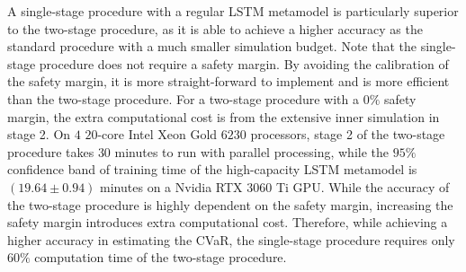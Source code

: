 A single-stage procedure with a regular LSTM metamodel is particularly superior to the two-stage procedure, as it is able to achieve a higher accuracy as the standard procedure with a much smaller simulation budget.
Note that the single-stage procedure does not require a safety margin.
By avoiding the calibration of the safety margin, it is more straight-forward to implement and is more efficient than the two-stage procedure.
For a two-stage procedure with a $0\%$ safety margin, the extra computational cost is from the extensive inner simulation in stage 2.
On $4$ $20$-core Intel Xeon Gold $\num{6230}$ processors, stage 2 of the two-stage procedure takes $30$ minutes to run with parallel processing, while the $95\%$ confidence band of training time of the high-capacity LSTM metamodel is $(19.64 \pm 0.94)$ minutes on a Nvidia RTX $\num{3060}$ Ti GPU.
While the accuracy of the two-stage procedure is highly dependent on the safety margin, increasing the safety margin introduces extra computational cost.
Therefore, while achieving a higher accuracy in estimating the CVaR, the single-stage procedure requires only $60\%$ computation time of the two-stage procedure.

